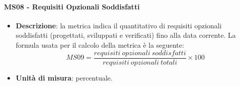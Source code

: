 		\paragraph{MS08 - Requisiti Opzionali Soddisfatti}
		\begin{itemize}
			\item \textbf{Descrizione}: la metrica indica il quantitativo di requisiti opzionali soddisfatti (progettati, sviluppati e verificati) fino alla data corrente. La formula usata per il calcolo della metrica è la seguente:
            \[
            MS09 = \frac{requisiti\ opzionali\ soddisfatti}{requisiti\ opzionali\ totali} \times 100
            \]
			\item \textbf{Unità di misura}: percentuale.
		\end{itemize}